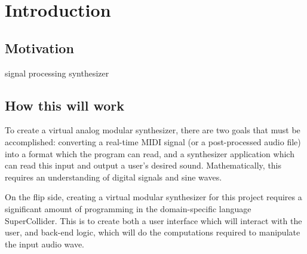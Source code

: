 \chapter{Introduction}\label{chapter:intro}

\section[Motivation]{Motivation}\label{section:motivation}
signal processing
synthesizer



\section[How this will work]{How this will work}

To create a virtual analog modular synthesizer, there are two goals that must be accomplished: converting a real-time MIDI signal (or a post-processed audio file) into a format which the program can read, and a synthesizer application which can read this input and output a user's desired sound. Mathematically, this requires an understanding of digital signals and sine waves. 

On the flip side, creating a virtual modular synthesizer for this project requires a significant amount of programming in the domain-specific language SuperCollider. This is to create both a user interface which will interact with the user, and back-end logic, which will do the computations required to manipulate the input audio wave.